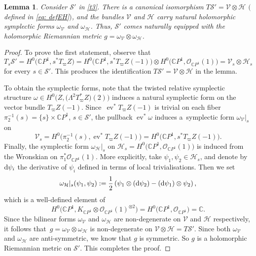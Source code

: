 \documentclass[pdftex]{sigma}
\numberwithin{equation}{section}
\newtheorem{Lemma}[Theorem]{Lemma}
\theoremstyle{definition}
\newcommand\C{{\mathbb C}}
\begin{document}
\begin{Lemma}\label{lem:TSEH}
Consider ${\mathcal S}'$ in \eqref{t3}.
There is a canonical isomorphism $T\mathcal S' = \mathcal V\otimes\mathcal H$
$($defined in \eqref{eq: defEH}$)$, and the bundles
$\mathcal V$ and $\mathcal H$ carry natural holomorphic symplectic forms $\omega_{\mathcal V}$ and
$\omega_{\mathcal H}$. Thus, $\mathcal S'$ comes naturally equipped with the holomorphic Riemannian
metric $g = \omega_{\mathcal V}\otimes\omega_{\mathcal H}$.
\end{Lemma}

\begin{proof}
To prove the first statement, observe that
\[
T_{s}\mathcal S' = H^0\bigl(\C P^1, s^*T_\varpi Z\bigr) = H^0\bigl(\C P^1, s^*T_\varpi Z(-1)\bigr)\otimes H^0\bigl(\C P^1, \mathcal{O}_{\C P^1}(1)\bigr) = \mathcal V_s\otimes \mathcal H_s
\]
for every $s\in \mathcal{S}'$. This produces the identification $T\mathcal S' = \mathcal V\otimes\mathcal H$ in the lemma.

To obtain the symplectic forms, note that the twisted relative symplectic structure
$\omega \in H^0\bigl(Z, \bigl(\Lambda^2 T^*_\varpi Z\bigr)(2)\bigr)$ induces a natural symplectic form on the vector
bundle $T_\varpi Z(-1)$. Since~${\operatorname{ev}^*T_\varpi Z(-1)}$ is trivial on each fiber $\pi_2^{-1}(s)
 = \{s\}\times\C P^1$, $s \in \mathcal S'$, the pullback $\operatorname{ev}^*\omega$ induces a~symplectic form $\omega_{\mathcal V}\big\vert_s$ on
\[
\mathcal V_s = H^0\bigl(\pi_2^{-1}(s), \operatorname{ev}^*T_\varpi Z(-1)\bigr) = H^0\bigl(\C P^1, s^*T_\varpi Z(-1)\bigr).
\]
Finally, the symplectic form $\omega_{\mathcal{H}}\big\vert_s$ on $\mathcal H_s = H^0\bigl(\C P^1, \mathcal{O}_{\C P^1}(1)\bigr)$ is
induced from the Wronskian on $\pi_1^*\mathcal{O}_{\C P^1}(1)$. More
explicitly, take $\psi_1, \psi_2 \in \mathcal{H}_s$, and denote by ${\rm d}\psi_i$ the derivative
of $\psi_i$ defined in terms of local trivialisations. Then we set
\begin{equation}\label{eq:omegaH}
\omega_{\mathcal H}|_s(\psi_1,\psi_2) := \frac{1}{2}\left(
\psi_1\otimes({\rm d}\psi_2) - ({\rm d}\psi_1)\otimes\psi_2\right),
\end{equation}
which is a well-defined element of
\[H^0\bigl(\C P^1, K_{\C P^1}\otimes \mathcal{O}_{\C P^1}(1)^{\otimes 2}\bigr)
 = H^0\bigl(\C P^1, \mathcal{O}_{\C P^1}\bigr) = \C.\]
Since the bilinear forms $\omega_{\mathcal V}$ and $\omega_{\mathcal H}$ are non-degenerate on $\mathcal V$ and $\mathcal H$
respectively, it follows that~${g = \omega_{\mathcal V}\otimes\omega_{\mathcal H}}$ is non-degenerate on
$\mathcal V\otimes\mathcal H = T\mathcal S'$. Since both $\omega_{\mathcal V}$ and $\omega_{\mathcal H}$ are
anti-symmetric, we know that $g$ is symmetric. So $g$ is a holomorphic Riemannian metric on ${\mathcal S}'$.
This completes the proof.
\end{proof}
\end{document}
